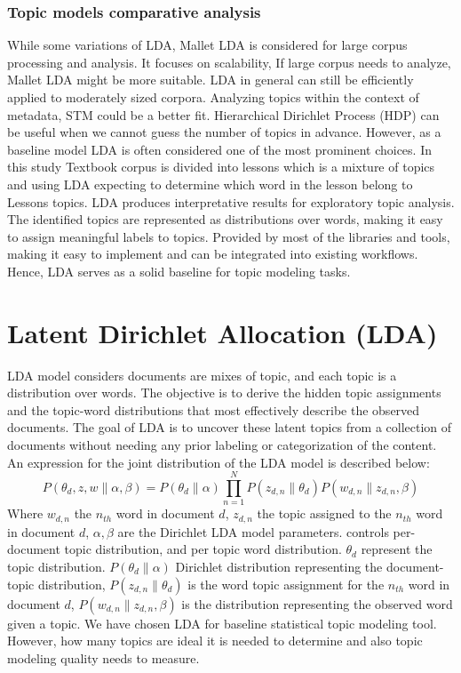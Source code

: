 \documentclass[sn-mathphys,Numbered]{sn-jnl}%
\theoremstyle{thmstyleone}%
\theoremstyle{thmstyletwo}%
\theoremstyle{thmstylethree}%
\begin{document}
\subsubsection{Topic models comparative analysis}
While some variations of LDA, Mallet LDA is considered for large corpus processing and analysis. It focuses on scalability, If large corpus needs to analyze, Mallet LDA might be more suitable. LDA in general can still be efficiently applied to moderately sized corpora. Analyzing topics within the context of metadata, STM could be a better fit. Hierarchical Dirichlet Process (HDP) can be useful when we cannot guess the number of topics in advance. However, as a baseline model LDA is often considered one of the most prominent choices. In this study Textbook corpus is divided into lessons which is a mixture of topics and using LDA expecting to determine which word in the lesson belong to Lesson\textquotesingle s topics. LDA produces interpretative results for exploratory topic analysis. The identified topics are represented as distributions over words, making it easy to assign meaningful labels to topics. Provided by most of the libraries and tools, making it easy to implement and can be integrated into existing workflows. Hence, LDA serves as a solid baseline for topic modeling tasks. 

\section{Latent Dirichlet Allocation (LDA)}
LDA model considers documents are mixes of topic, and each topic is a distribution over words. The objective is to derive the hidden topic assignments and the topic-word distributions that most effectively describe the observed documents. The goal of LDA is to uncover these latent topics from a collection of documents without needing any prior labeling or categorization of the content. An expression for the joint distribution of the LDA model is described below:  
\begin{equation}
P(\theta_d,z,w\|\alpha,\beta)=P(\theta_d\|\alpha)\prod^N_{n=1}P(z_{d,n}\|\theta_d)P(w_{d,n}\|z_{d,n},\beta)
\end{equation}
Where $w_{d,n}$ the $n_{th}$ word in document $d$, $z_{d,n}$ the topic assigned to the $n_{th}$ word in document $d$, $\alpha,\beta$ are the Dirichlet LDA model parameters. controls per-document topic distribution, and per topic word distribution. $\theta_d$ represent the topic distribution. $P(\theta_d \| \alpha)$ Dirichlet 
distribution representing the document-topic distribution, $P(z_{d,n}\|\theta_d)$ is the word topic assignment for the $n_{th}$ word in document $d$, $P(w_{d,n}\|z_{d,n},\beta)$ is the distribution representing the observed word given a topic. We have chosen LDA for baseline statistical topic modeling tool. However, how many topics are ideal it is needed to determine and also topic modeling quality needs to measure.
\end{document}
